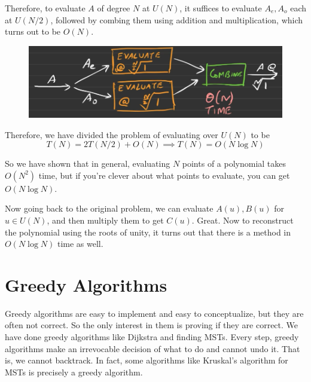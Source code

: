 \documentclass{article}
\begin{document}
    Therefore, to evaluate $A$ of degree $N$ at $U(N)$, it suffices to evaluate $A_e, A_o$ each at $U(N/2)$, followed by combing them using addition and multiplication, which turns out to be $O(N)$. 

    \begin{figure}[H]
      \centering 
      \includegraphics[scale=0.4]{img/fft.png}
      \caption{} 
      \label{fig:fft}
    \end{figure}

    \begin{algo}
      
      \begin{algorithm}[H]
        \label{alg:unity}
        \begin{algorithmic}
          \Require{}
          \State 
          \EndFunction
        \end{algorithmic}
      \end{algorithm}
    \end{algo}

    Therefore, we have divided the problem of evaluating over $U(N)$ to be 
    \begin{equation}
      T(N) = 2 T(N/2) + O(N) \implies T(N) = O( N \log{N}) 
    \end{equation}

    So we have shown that in general, evaluating $N$ points of a polynomial takes $O(N^2)$ time, but if you're clever about what points to evaluate, you can get $O(N \log N)$. 

    Now going back to the original problem, we can evaluate $A(u), B(u)$ for $u \in U(N)$, and then multiply them to get $C(u)$. Great. Now to reconstruct the polynomial using the roots of unity, it turns out that there is a method in $O(N \log{N})$ time as well. 

\section{Greedy Algorithms}

  Greedy algorithms are easy to implement and easy to conceptualize, but they are often not correct. So the only interest in them is proving if they are correct. We have done greedy algorithms like Dijkstra and finding MSTs. Every step, greedy algorithms make an irrevocable decision of what to do and cannot undo it. That is, we cannot backtrack. In fact, some algorithms like Kruskal's algorithm for MSTs is precisely a greedy algorithm. 
  
\end{document}
